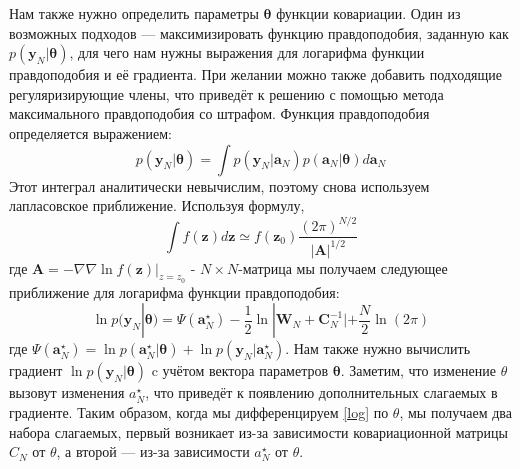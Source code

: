 {Нам также нужно определить параметры $\mathbf{\theta}$ функции ковариации. Один из возможных подходов — максимизировать функцию правдоподобия, заданную как $p(\mathbf{y}_N|\mathbf{\theta})$, для чего нам нужны выражения для логарифма функции правдоподобия и её градиента. При желании можно также добавить подходящие регуляризирующие члены, что приведёт к решению с помощью метода максимального правдоподобия со штрафом. Функция правдоподобия определяется выражением:
\[
p(\mathbf{y}_N|\mathbf{\theta}) = \int p(\mathbf{y}_N|\mathbf{a}_N)p(\mathbf{a}_N|\mathbf{\theta})d\mathbf{a}_N 
\]
Этот интеграл аналитически невычислим, поэтому снова используем лапласовское приближение. Используя формулу, 
\[
\int f(\mathbf{z})d\mathbf{z} \simeq f(\mathbf{z}_0)\frac{(2 \pi)^{N/2}}{|\mathbf{A}|^{1/2}}
\]
где $\mathbf{A}=-\nabla \nabla \ln f(\mathbf{z})|_{z=z_0}$ - $N \times N$-матрица мы получаем следующее приближение для логарифма функции правдоподобия:
\begin{equation}
\label{log}
\ln p(\mathbf{y}_N|\mathbf{\theta}) = \Psi(\mathbf{a}_N^{\star}) - \frac{1}{2}\ln|\mathbf{W}_N+ \mathbf{C}_N^{-1}| + \frac{N}{2}\ln(2\pi) 
\end{equation}
где $\Psi(\mathbf{a}_N^{\star}) = \ln p(\mathbf{a}_N^{\star}|\mathbf{\theta}) + \ln p(\mathbf{y}_N|\mathbf{a}_N^{\star})$. Нам также нужно вычислить градиент $\ln p(\mathbf{y}_N|\mathbf{\theta})$ c учётом вектора параметров $\mathbf{\theta}$. Заметим, что изменение $\theta$ вызовут изменения $a_N^{\star}$, что приведёт к появлению дополнительных слагаемых в градиенте. Таким образом, когда мы дифференцируем \ref{log} по $\theta$, мы получаем два набора слагаемых, первый возникает из-за зависимости ковариационной матрицы $C_N$ от $\theta$, а второй — из-за зависимости $a_N^{\star}$ от $\theta$.

}
